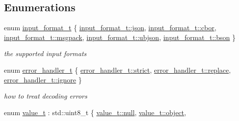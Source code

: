 \subsection*{Enumerations}
\begin{DoxyCompactItemize}
\item 
enum \hyperlink{namespacenlohmann_1_1detail_aa554fc6a11519e4f347deb25a9f0db40}{input\+\_\+format\+\_\+t} \{ \newline
\hyperlink{namespacenlohmann_1_1detail_aa554fc6a11519e4f347deb25a9f0db40a466deec76ecdf5fca6d38571f6324d54}{input\+\_\+format\+\_\+t\+::json}, 
\hyperlink{namespacenlohmann_1_1detail_aa554fc6a11519e4f347deb25a9f0db40aaf9de350d652f0c9055ddab514bd23ea}{input\+\_\+format\+\_\+t\+::cbor}, 
\hyperlink{namespacenlohmann_1_1detail_aa554fc6a11519e4f347deb25a9f0db40ac40d516627022a54003ac2b74a82688a}{input\+\_\+format\+\_\+t\+::msgpack}, 
\hyperlink{namespacenlohmann_1_1detail_aa554fc6a11519e4f347deb25a9f0db40a4537f20910e85437f6d07701864084e8}{input\+\_\+format\+\_\+t\+::ubjson}, 
\newline
\hyperlink{namespacenlohmann_1_1detail_aa554fc6a11519e4f347deb25a9f0db40a0b6879b186bfb2b1ec65d2460e4eccd4}{input\+\_\+format\+\_\+t\+::bson}
 \}\begin{DoxyCompactList}\small\item\em the supported input formats \end{DoxyCompactList}
\item 
enum \hyperlink{namespacenlohmann_1_1detail_a5a76b60b26dc8c47256a996d18d967df}{error\+\_\+handler\+\_\+t} \{ \hyperlink{namespacenlohmann_1_1detail_a5a76b60b26dc8c47256a996d18d967dfa2133fd717402a7966ee88d06f9e0b792}{error\+\_\+handler\+\_\+t\+::strict}, 
\hyperlink{namespacenlohmann_1_1detail_a5a76b60b26dc8c47256a996d18d967dfa9dde360102c103867bd2f45872f1129c}{error\+\_\+handler\+\_\+t\+::replace}, 
\hyperlink{namespacenlohmann_1_1detail_a5a76b60b26dc8c47256a996d18d967dfa567bc1d268f135496de3d5b946b691f3}{error\+\_\+handler\+\_\+t\+::ignore}
 \}\begin{DoxyCompactList}\small\item\em how to treat decoding errors \end{DoxyCompactList}
\item 
enum \hyperlink{namespacenlohmann_1_1detail_a1ed8fc6239da25abcaf681d30ace4985}{value\+\_\+t} \+: std\+::uint8\+\_\+t \{ \newline
\hyperlink{namespacenlohmann_1_1detail_a1ed8fc6239da25abcaf681d30ace4985a37a6259cc0c1dae299a7866489dff0bd}{value\+\_\+t\+::null}, 
\hyperlink{namespacenlohmann_1_1detail_a1ed8fc6239da25abcaf681d30ace4985aa8cfde6331bd59eb2ac96f8911c4b666}{value\+\_\+t\+::object}, 

\end{DoxyCompactItemize}
